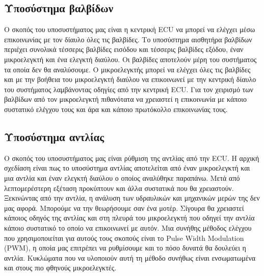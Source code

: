 \documentclass{article}
\begin{document}
\subsection{Υποσύστημα βαλβίδων}\label{valves-module}
Ο σκοπός του υποσυστήματος μας είναι η κεντρική ECU να μπορεί να ελέγχει μέσω επικοινωνίας με τον δίαυλο όλες τις βαλβίδες. Το υποσύστημα αισθητήρα βαλβίδων περιέχει συνολικά τέσσερις βαλβίδες εισόδου και τέσσερις βαλβίδες εξόδου, έναν μικροελεγκτή και ένα ελεγκτή διαύλου. Οι βαλβίδες αποτελούν μέρη του συστήματος τα οποία δεν θα αναλύσουμε. Ο μικροελεγκτής μπορεί να ελέγχει όλες τις βαλβίδες και με την βοήθεια του μικροελεγκτή διαύλου να επικοινωνεί με την κεντρική δίαυλο του συστήματος λαμβάνοντας οδηγίες από την κεντρική ECU. Για τον χειρισμό των βαλβίδων από τον μικροελεγκτή πιθανότατα να χρειαστεί η επικοινωνία με κάποιο συστατικό ελέγχου τους και άρα και κάποιο πρωτόκολλο επικοινωνίας τους.

\subsection{Υποσύστημα αντλίας}
Ο σκοπός του υποσυστήματος μας είναι ρύθμιση της αντλίας από την ECU. Η αρχική σχεδίαση είναι πως το υποσύστημα αντλίας αποτελείται από έναν μικροελεγκτή και μια αντλία και έναν ελεγκτή διαύλου ο οποίος αναλύθηκε παραπάνω. Μετά από λεπτομερέστερη εξέταση προκύπτουν και άλλα συστατικά που θα χρειαστούν. Ξεκινώντας από την αντλία, η ανάλυση των υδραυλικών και μηχανικών μερών της δεν μας αφορά. Μπορούμε να την θεωρήσουμε σαν ένα μοτέρ. Σίγουρα θα χρειαστεί κάποιος οδηγός της αντλίας και στη πλευρά του μικροελεγκτή που οδηγεί την αντλία κάποιο συστατικό το οποίο να επικοινωνεί με αυτόν. Μια συνήθης μέθοδος ελέγχου που χρησιμοποιείται για αυτούς τους σκοπούς είναι το Pulse Width Modulation (PWM), η οποία μας επιτρέπει να ρυθμίσουμε και το πόσο δυνατά θα δουλεύει η αντλία. Κυκλώματα που να υλοποιούν αυτή τη μέθοδο συνήθως είναι ενσωματωμένα και στους πιο φθηνούς μικροελεγκτές.

\end{document}
